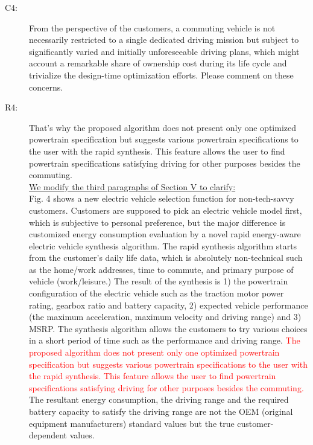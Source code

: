 \documentclass[onecolumn]{IEEEconf}
\begin{document}
\begin{description}
\item [C4:] From the perspective of the customers, a commuting vehicle is not necessarily restricted to a single dedicated driving mission but subject to significantly varied and initially unforeseeable driving plans, which might account a remarkable share of ownership cost during its life cycle and trivialize the design-time optimization efforts. Please comment on these concerns.
\item [R4: ] That's why the proposed algorithm does not present only one optimized powertrain specification but suggests various powertrain specifications to the user with the rapid synthesis. This feature allows the user to find powertrain specifications satisfying driving for other purposes besides the commuting.\\

\underline{We modify the third paragraphs of Section V to clarify:}\\
Fig. 4 shows a new electric vehicle selection function for non-tech-savvy customers. Customers are supposed to pick an electric vehicle model first, which is subjective to personal preference, but the major difference is customized energy consumption evaluation by a novel rapid energy-aware electric vehicle synthesis algorithm. The rapid synthesis algorithm starts from the customer’s daily life data, which is absolutely non-technical such as the home/work addresses, time to commute, and primary purpose of vehicle (work/leisure.) The result of the synthesis is 1) the powertrain configuration of the electric vehicle such as the traction motor power rating, gearbox ratio and battery capacity, 2) expected vehicle performance (the maximum acceleration, maximum velocity and driving range) and 3) MSRP. The synthesis algorithm allows the customers to try various choices in a short period of time such as the performance and driving range. 
\textcolor{red}{The proposed algorithm does not present only one optimized powertrain specification but suggests various powertrain specifications to the user with the rapid synthesis. This feature allows the user to find powertrain specifications satisfying driving for other purposes besides the commuting.}
The resultant energy consumption, the driving range and the required battery capacity to satisfy the driving range are not the OEM (original equipment manufacturers) standard values but the true customer-dependent values. 

\end{description}

\pagebreak
\end{document}

